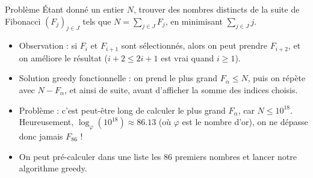 \begin{frame}
    \frametitle{\problemtitle}
    \begin{block}{Problème}
        Étant donné un entier $N$, trouver des nombres distincts de la suite de Fibonacci $(F_{j})_{j \in J}$ tels que $N = \sum_{j \in J} F_{j}$, en minimisant $\sum_{j \in J} j$.
    \end{block}
    \pause
    \begin{itemize}[<+->]
        \item Observation : si $F_i$ et $F_{i+1}$ sont sélectionnés, alors on peut prendre $F_{i+2}$, et on améliore le résultat ($i+2 \leq 2i+1$ est vrai quand $i \geq 1$).
        \item Solution greedy fonctionnelle : on prend le plus grand $F_\alpha \leq N$, puis on répète avec $N - F_{\alpha}$, et ainsi de suite, avant d'afficher la somme des indices choisis.
        \item Problème : c'est peut-être long de calculer le plus grand $F_\alpha$, car $N \leq 10^{18}$. Heureusement, $\log_{\varphi}(10^{18}) \approx 86.13$ (où $\varphi$ est le nombre d'or), on ne dépasse donc jamais $F_{86}$ !
        \item On peut pré-calculer dans une liste les $86$ premiers nombres et lancer notre algorithme greedy.
    \end{itemize}

\end{frame}
